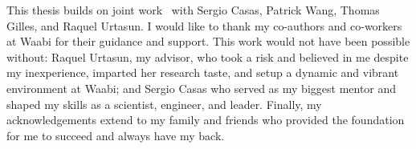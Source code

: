 \begin{acknowledgements}
    This thesis builds on joint work~\cite{MAD}
    with Sergio Casas, Patrick Wang, Thomas Gilles, and Raquel Urtasun.
    I would like to thank my co-authors and co-workers at Waabi for their guidance
    and support.
    This work would not have been possible without: Raquel Urtasun, my advisor,
    who took a risk and believed in me despite my inexperience,
    imparted her research taste, and setup a dynamic and vibrant environment at Waabi;
    and Sergio Casas who served as my biggest mentor
    and shaped my skills as a scientist, engineer, and leader.
    Finally, my acknowledgements extend to my family and friends who provided the foundation for
    me to succeed and always have my back.
\end{acknowledgements}